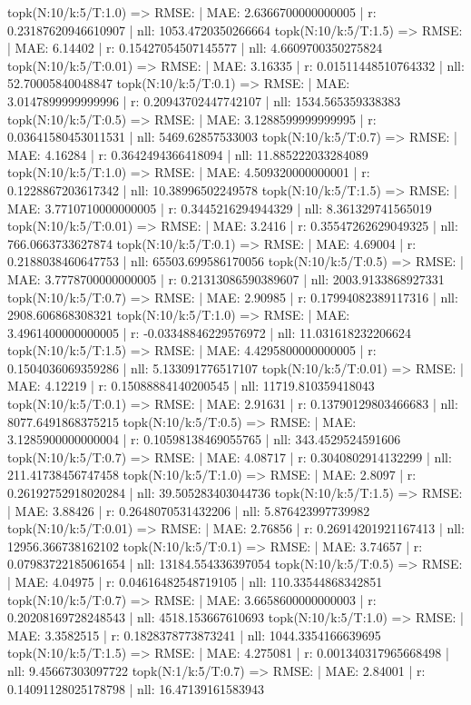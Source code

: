 topk(N:10/k:5/T:1.0) => RMSE: | MAE: 2.6366700000000005 | r: 0.23187620946610907 | nll: 1053.4720350266664
topk(N:10/k:5/T:1.5) => RMSE: | MAE: 6.14402 | r: 0.15427054507145577 | nll: 4.6609700350275824
topk(N:10/k:5/T:0.01) => RMSE: | MAE: 3.16335 | r: 0.01511448510764332 | nll: 52.70005840048847
topk(N:10/k:5/T:0.1) => RMSE: | MAE: 3.0147899999999996 | r: 0.20943702447742107 | nll: 1534.565359338383
topk(N:10/k:5/T:0.5) => RMSE: | MAE: 3.1288599999999995 | r: 0.03641580453011531 | nll: 5469.62857533003
topk(N:10/k:5/T:0.7) => RMSE: | MAE: 4.16284 | r: 0.3642494366418094 | nll: 11.885222033284089
topk(N:10/k:5/T:1.0) => RMSE: | MAE: 4.509320000000001 | r: 0.1228867203617342 | nll: 10.38996502249578
topk(N:10/k:5/T:1.5) => RMSE: | MAE: 3.7710710000000005 | r: 0.3445216294944329 | nll: 8.361329741565019
topk(N:10/k:5/T:0.01) => RMSE: | MAE: 3.2416 | r: 0.35547262629049325 | nll: 766.0663733627874
topk(N:10/k:5/T:0.1) => RMSE: | MAE: 4.69004 | r: 0.2188038460647753 | nll: 65503.699586170056
topk(N:10/k:5/T:0.5) => RMSE: | MAE: 3.7778700000000005 | r: 0.21313086590389607 | nll: 2003.9133868927331
topk(N:10/k:5/T:0.7) => RMSE: | MAE: 2.90985 | r: 0.17994082389117316 | nll: 2908.606868308321
topk(N:10/k:5/T:1.0) => RMSE: | MAE: 3.4961400000000005 | r: -0.03348846229576972 | nll: 11.031618232206624
topk(N:10/k:5/T:1.5) => RMSE: | MAE: 4.4295800000000005 | r: 0.1504036069359286 | nll: 5.133091776517107
topk(N:10/k:5/T:0.01) => RMSE: | MAE: 4.12219 | r: 0.15088884140200545 | nll: 11719.810359418043
topk(N:10/k:5/T:0.1) => RMSE: | MAE: 2.91631 | r: 0.13790129803466683 | nll: 8077.6491868375215
topk(N:10/k:5/T:0.5) => RMSE: | MAE: 3.1285900000000004 | r: 0.10598138469055765 | nll: 343.4529524591606
topk(N:10/k:5/T:0.7) => RMSE: | MAE: 4.08717 | r: 0.3040802914132299 | nll: 211.41738456747458
topk(N:10/k:5/T:1.0) => RMSE: | MAE: 2.8097 | r: 0.26192752918020284 | nll: 39.505283403044736
topk(N:10/k:5/T:1.5) => RMSE: | MAE: 3.88426 | r: 0.2648070531432206 | nll: 5.876423997739982
topk(N:10/k:5/T:0.01) => RMSE: | MAE: 2.76856 | r: 0.26914201921167413 | nll: 12956.366738162102
topk(N:10/k:5/T:0.1) => RMSE: | MAE: 3.74657 | r: 0.07983722185061654 | nll: 13184.554336397054
topk(N:10/k:5/T:0.5) => RMSE: | MAE: 4.04975 | r: 0.04616482548719105 | nll: 110.33544868342851
topk(N:10/k:5/T:0.7) => RMSE: | MAE: 3.6658600000000003 | r: 0.20208169728248543 | nll: 4518.153667610693
topk(N:10/k:5/T:1.0) => RMSE: | MAE: 3.3582515 | r: 0.1828378773873241 | nll: 1044.3354166639695
topk(N:10/k:5/T:1.5) => RMSE: | MAE: 4.275081 | r: 0.001340317965668498 | nll: 9.45667303097722
topk(N:1/k:5/T:0.7) => RMSE: | MAE: 2.84001 | r: 0.14091128025178798 | nll: 16.47139161583943
